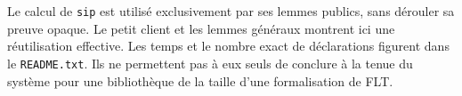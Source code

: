 \documentclass[11pt]{article}
\begin{document}
Le calcul de \texttt{sip} est utilisé exclusivement par ses lemmes publics,
sans dérouler sa preuve opaque. Le petit client et les lemmes généraux
montrent ici une réutilisation effective. Les temps et le nombre exact
de déclarations figurent dans le \texttt{README.txt}. Ils ne permettent
pas à eux seuls de conclure à la tenue du système pour une bibliothèque
de la taille d'une formalisation de FLT.
\end{document}
